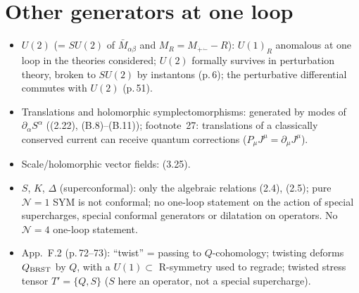 \documentclass[11pt]{article}
\newcommand{\dm}{\dot{-}}
\newcommand{\dpl}{\dot{+}}
\begin{document}
\section{Other generators at one loop}
\begin{itemize}
\item $U(2)$ (= $SU(2)$ of $\bar M_{\alpha\beta}$ and $M_R=M_{\dpl\dm}-R$): $U(1)_R$ anomalous at one loop in the theories considered; $U(2)$ formally survives in perturbation theory, broken to $SU(2)$ by instantons (p.\,6); the perturbative differential commutes with $U(2)$ (p.\,51).
\item Translations and holomorphic symplectomorphisms: generated by modes of $\partial_\alpha S^\alpha$ ((2.22), (B.8)--(B.11)); footnote~27: translations of a classically conserved current can receive quantum corrections ($P_\mu J^\mu=\partial_\mu J^\mu$).
\item Scale/holomorphic vector fields: (3.25).
\item $S$, $K$, $\Delta$ (superconformal): only the algebraic relations (2.4), (2.5); pure $\mathcal N=1$ SYM is not conformal; no one-loop statement on the action of special supercharges, special conformal generators or dilatation on operators. No $\mathcal N=4$ one-loop statement.
\item App.~F.2 (p.\,72--73): ``twist'' = passing to $Q$-cohomology; twisting deforms $Q_{\rm BRST}$ by $Q$, with a $U(1)\subset$ R-symmetry used to regrade; twisted stress tensor $T'=\{Q,S\}$ ($S$ here an operator, not a special supercharge).
\end{itemize}
\end{document}
